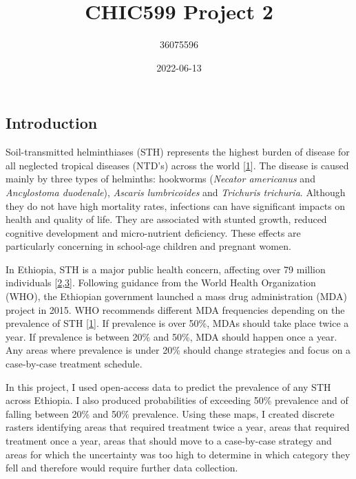 \documentclass[
]{article}
\title{CHIC599 Project 2}
\author{36075596}
\date{2022-06-13}
\begin{document}
\maketitle

\hypertarget{introduction}{%
\subsection{Introduction}\label{introduction}}

Soil-transmitted helminthiases (STH) represents the highest burden of
disease for all neglected tropical diseases (NTD's) across the world
{[}\protect\hyperlink{ref-worldhealthorganizationEliminatingSoiltransmittedHelminthiases2012}{1}{]}.
The disease is caused mainly by three types of helminths: hookworms
(\emph{Necator americanus} and \emph{Ancylostoma duodenale}),
\emph{Ascaris lumbricoides} and \emph{Trichuris trichuria}. Although
they do not have high mortality rates, infections can have significant
impacts on health and quality of life. They are associated with stunted
growth, reduced cognitive development and micro-nutrient deficiency.
These effects are particularly concerning in school-age children and
pregnant women.

In Ethiopia, STH is a major public health concern, affecting over 79
million individuals
{[}\protect\hyperlink{ref-sartoriusPrevalenceIntensitySoiltransmitted2021}{2},\protect\hyperlink{ref-aemiroPrevalenceSoilTransmittedHelminthes2022}{3}{]}.
Following guidance from the World Health Organization (WHO), the
Ethiopian government launched a mass drug administration (MDA) project
in 2015. WHO recommends different MDA frequencies depending on the
prevalence of STH
{[}\protect\hyperlink{ref-worldhealthorganizationEliminatingSoiltransmittedHelminthiases2012}{1}{]}.
If prevalence is over 50\%, MDAs should take place twice a year. If
prevalence is between 20\% and 50\%, MDA should happen once a year. Any
areas where prevalence is under 20\% should change strategies and focus
on a case-by-case treatment schedule.

In this project, I used open-access data to predict the prevalence of
any STH across Ethiopia. I also produced probabilities of exceeding 50\%
prevalence and of falling between 20\% and 50\% prevalence. Using these
maps, I created discrete rasters identifying areas that required
treatment twice a year, areas that required treatment once a year, areas
that should move to a case-by-case strategy and areas for which the
uncertainty was too high to determine in which category they fell and
therefore would require further data collection.
\end{document}
